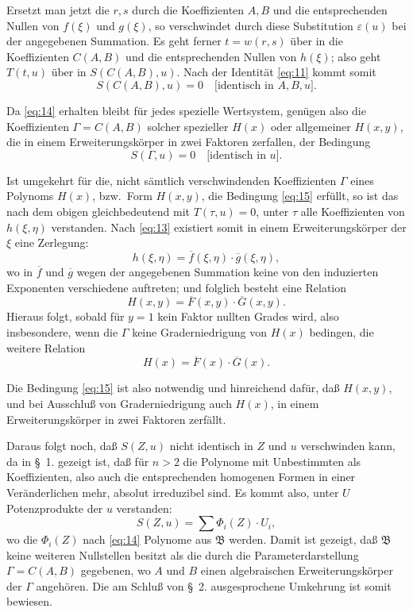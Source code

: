 \documentclass[fontsize=10pt,paper=a5,pagesize,headings=small]{scrbook}
\newcommand{\ideal}[1]{\mathfrak{#1}}
\theoremstyle{plain}
\begin{document}
Ersetzt man jetzt die $r,s$ durch die Koeffizienten $A,B$ und die entsprechenden
Nullen von $f(\xi)$ und $g(\xi)$, so verschwindet durch diese Substitution $\varepsilon(u)$
bei der angegebenen Summation. Es geht ferner $t = w(r,s)$ über in die
Koeffizienten $C(A,B)$ und die entsprechenden Nullen von $h(\xi)$; also geht
$T(t,u)$ über in $S(C(A,B),u)$. Nach der Identität \eqref{eq:11} kommt somit
\begin{equation}
\label{eq:14}
S(C(A,B),u) = 0 \quad \text{[identisch in $A,B,u$]}.
\end{equation}

\newpage
\setcounter{page}{416}

Da \eqref{eq:14} erhalten bleibt für jedes spezielle Wertsystem, genügen also die
Koeffizienten $\varGamma = C(A,B)$ solcher spezieller $H(x)$ oder allgemeiner
$H(x,y)$, die in einem Erweiterungskörper in zwei Faktoren zerfallen, der
Bedingung
\begin{equation}
\label{eq:15}
S(\varGamma,u) = 0 \quad \text{[identisch in $u$]}.
\end{equation}

Ist umgekehrt für die, nicht sämtlich verschwindenden Koeffizienten $\varGamma$
eines Polynoms $H(x)$, bzw.~Form $H(x,y)$, die Bedingung \eqref{eq:15} erfüllt,
so ist das nach dem obigen gleichbedeutend mit $T(\tau,u) = 0$, unter $\tau$
alle Koeffizienten von $h(\xi,\eta)$ verstanden. Nach \eqref{eq:13} existiert somit in einem
Erweiterungskörper der $\xi$ eine Zerlegung:
\[ h(\xi,\eta) = \overline{f}(\xi,\eta) \cdot \overline{g}(\xi,\eta), \]
wo in $\overline{f}$ und $\overline{g}$ wegen der angegebenen Summation keine von den induzierten
Exponenten verschiedene auftreten; und folglich besteht eine Relation
\[ H(x,y) = \overline{F}(x,y) \cdot \overline{G}(x,y). \]
Hieraus folgt, sobald für $y=1$ kein Faktor nullten Grades wird, also
insbesondere, wenn die $\varGamma$ keine Graderniedrigung von $H(x)$ bedingen, die
weitere Relation
\[ H(x) = \overline{F}(x) \cdot \overline{G}(x). \]

Die Bedingung \eqref{eq:15} ist also notwendig und hinreichend dafür, daß
$H(x,y)$, und bei Ausschluß von Graderniedrigung auch $H(x)$, in einem
Erweiterungskörper in zwei Faktoren zerfällt.

Daraus folgt noch, daß $S(Z,u)$ nicht identisch in $Z$ und $u$ verschwinden
kann, da in \S~1. gezeigt ist, daß für $n > 2$ die Polynome mit Unbestimmten
als Koeffizienten, also auch die entsprechenden homogenen Formen in einer
Veränderlichen mehr, absolut irreduzibel sind. Es kommt also, unter $U$
Potenzprodukte der $u$ verstanden:
\[ S(Z,u) = \sum \varPhi_i(Z) \cdot U_i, \]
wo die $\varPhi_i(Z)$ nach \eqref{eq:14} Polynome aus $\ideal{B}$ werden. Damit ist gezeigt,
daß $\ideal{B}$ keine weiteren Nullstellen besitzt als die durch die Parameterdarstellung
$\varGamma = C(A,B)$ gegebenen, wo $A$ und $B$ einen algebraischen Erweiterungskörper
der $\varGamma$ angehören. Die am Schluß von \S~2. ausgesprochene Umkehrung ist somit
bewiesen.
\end{document}
